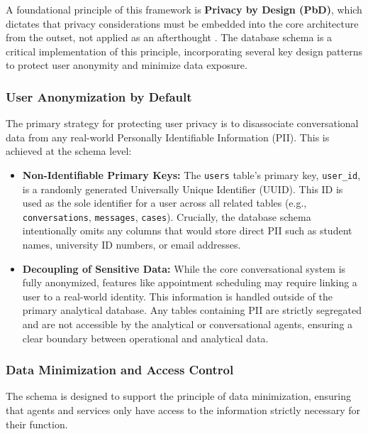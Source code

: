 A foundational principle of this framework is \textbf{Privacy by Design (PbD)}, which dictates that privacy considerations must be embedded into the core architecture from the outset, not applied as an afterthought \cite{cavoukian2011privacybydesign, iso2023privacy31700}. The database schema is a critical implementation of this principle, incorporating several key design patterns to protect user anonymity and minimize data exposure.

\subsubsection{User Anonymization by Default}
The primary strategy for protecting user privacy is to disassociate conversational data from any real-world Personally Identifiable Information (PII). This is achieved at the schema level:

\begin{itemize}
    \item \textbf{Non-Identifiable Primary Keys:} The \texttt{users} table's primary key, \texttt{user\_id}, is a randomly generated Universally Unique Identifier (UUID). This ID is used as the sole identifier for a user across all related tables (e.g., \texttt{conversations}, \texttt{messages}, \texttt{cases}). Crucially, the database schema intentionally omits any columns that would store direct PII such as student names, university ID numbers, or email addresses.
    \item \textbf{Decoupling of Sensitive Data:} While the core conversational system is fully anonymized, features like appointment scheduling may require linking a user to a real-world identity. This information is handled outside of the primary analytical database. Any tables containing PII are strictly segregated and are not accessible by the analytical or conversational agents, ensuring a clear boundary between operational and analytical data.
\end{itemize}

\subsubsection{Data Minimization and Access Control}
The schema is designed to support the principle of data minimization, ensuring that agents and services only have access to the information strictly necessary for their function.

